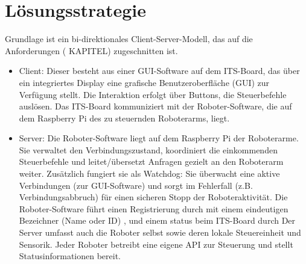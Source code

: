 \chapter{Lösungsstrategie}


Grundlage ist ein bi-direktionales Client-Server-Modell, das auf die Anforderungen ( KAPITEL)
zugeschnitten ist.
 

\begin{itemize}
	\item{Client:} Dieser besteht aus einer GUI-Software auf dem ITS-Board, das über ein integriertes Display eine grafische Benutzeroberfläche (GUI) zur Verfügung stellt. Die Interaktion erfolgt über Buttons, die Steuerbefehle auslösen. Das ITS-Board kommuniziert mit der Roboter-Software, die auf dem Raspberry Pi des zu steuernden Roboterarms, liegt.
	
	\item{Server:} Die Roboter-Software liegt auf dem Raspberry Pi der Roboterarme. Sie verwaltet den Verbindungszustand, koordiniert die einkommenden Steuerbefehle und leitet/übersetzt Anfragen gezielt an den Roboterarm weiter. Zusätzlich fungiert sie als Watchdog: Sie überwacht eine aktive Verbindungen (zur GUI-Software) und sorgt im Fehlerfall (z.B. Verbindungsabbruch) für einen sicheren Stopp der Roboteraktivität. Die Roboter-Software führt einen Registrierung durch mit einem eindeutigen Bezeichner (Name oder ID) , und einem status beim ITS-Board durch
	Der Server umfasst auch die Roboter selbst sowie deren lokale Steuereinheit und Sensorik. Jeder Roboter betreibt eine eigene API zur Steuerung und stellt Statusinformationen bereit. 	
\end{itemize} 

